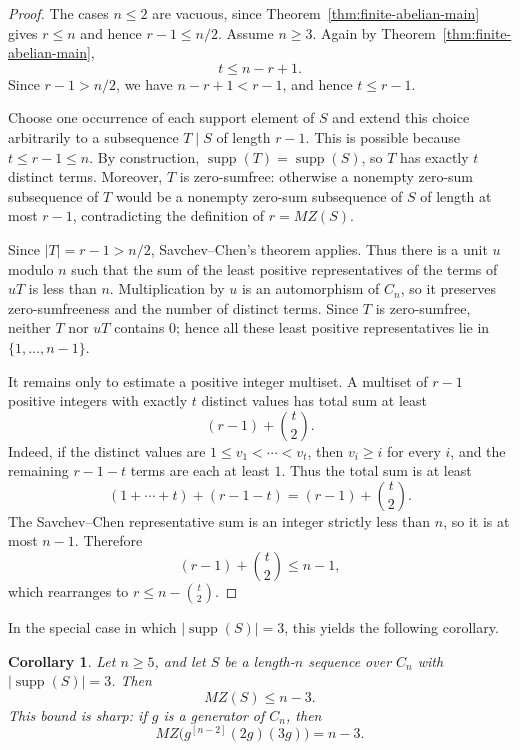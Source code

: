 \documentclass[12pt,reqno]{amsart}
\newtheorem{corollary}[theorem]{Corollary}
\theoremstyle{definition}
\theoremstyle{remark}
\DeclareMathOperator{\supp}{supp}
\begin{document}
\begin{proof}
The cases $n\le 2$ are vacuous, since Theorem~\ref{thm:finite-abelian-main} gives $r\le n$ and hence $r-1\le n/2$.  Assume $n\ge 3$.  Again by Theorem~\ref{thm:finite-abelian-main},
\[
  t\le n-r+1.
\]
Since $r-1>n/2$, we have $n-r+1<r-1$, and hence $t\le r-1$.

Choose one occurrence of each support element of $S$ and extend this choice arbitrarily to a subsequence $T\mid S$ of length $r-1$.  This is possible because $t\le r-1\le n$.  By construction, $\supp(T)=\supp(S)$, so $T$ has exactly $t$ distinct terms.  Moreover, $T$ is zero-sumfree: otherwise a nonempty zero-sum subsequence of $T$ would be a nonempty zero-sum subsequence of $S$ of length at most $r-1$, contradicting the definition of $r=MZ(S)$.

Since $|T|=r-1>n/2$, Savchev--Chen's theorem \cite[Theorem~8]{SavchevChen2006} applies.  Thus there is a unit $u$ modulo $n$ such that the sum of the least positive representatives of the terms of $uT$ is less than $n$.  Multiplication by $u$ is an automorphism of $C_n$, so it preserves zero-sumfreeness and the number of distinct terms.  Since $T$ is zero-sumfree, neither $T$ nor $uT$ contains $0$; hence all these least positive representatives lie in $\{1,\ldots,n-1\}$.

It remains only to estimate a positive integer multiset.  A multiset of $r-1$ positive integers with exactly $t$ distinct values has total sum at least
\[
  (r-1)+\binom{t}{2}.
\]
Indeed, if the distinct values are $1\le v_1<\cdots<v_t$, then $v_i\ge i$ for every $i$, and the remaining $r-1-t$ terms are each at least $1$.  Thus the total sum is at least
\[
  (1+\cdots+t)+(r-1-t)=(r-1)+\binom{t}{2}.
\]
The Savchev--Chen representative sum is an integer strictly less than $n$, so it is at most $n-1$.  Therefore
\[
  (r-1)+\binom{t}{2}\le n-1,
\]
which rearranges to $r\le n-\binom{t}{2}$.
\end{proof}

In the special case in which $|\supp(S)| =3$, this yields the following corollary.

\begin{corollary}\label{cor:support-three-cyclic}
Let $n\ge 5$, and let $S$ be a length-$n$ sequence over $C_n$ with $|\supp(S)|=3$.  Then
\[
  MZ(S)\le n-3.
\]
This bound is sharp: if $g$ is a generator of $C_n$, then
\[
  MZ\bigl(g^{[n-2]}(2g)(3g)\bigr)=n-3.
\]
\end{corollary}
\end{document}
